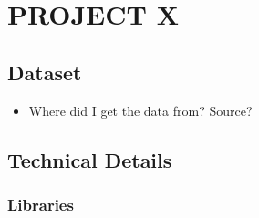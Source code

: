\chapter{PROJECT X}

\section{Dataset}
\begin{itemize}
\item Where did I get the data from? Source?
\tem 
\end{itemize}
\section{Technical Details}
\subsection{Libraries}